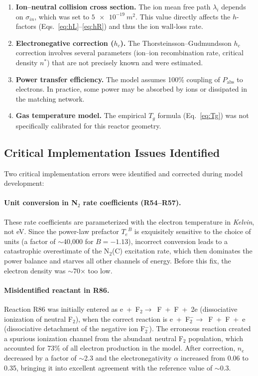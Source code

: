 \documentclass[11pt,a4paper]{article}
\newcommand{\Te}{\ensuremath{T_e}}
\newcommand{\Tg}{\ensuremath{T_g}}
\renewcommand{\ne}{\ensuremath{n_e}}
\begin{document}
\begin{enumerate}[nosep]
  \item \textbf{Ion--neutral collision cross section.} The ion mean free path
    $\lambda_i$ depends on $\sigma_{in}$, which was set to
    $\SI{5e-19}{m^2}$. This value directly affects the $h$-factors
    (Eqs.~\ref{eq:hL}--\ref{eq:hR}) and thus the ion wall-loss rate.
  \item \textbf{Electronegative correction ($h_c$).} The Thorsteinsson--Gudmundsson
    $h_c$ correction involves several parameters (ion--ion recombination rate,
    critical density $n^*$) that are not precisely known and were estimated.
  \item \textbf{Power transfer efficiency.} The model assumes 100\% coupling of
    $P_{\text{abs}}$ to electrons. In practice, some power may be absorbed by
    ions or dissipated in the matching network.
  \item \textbf{Gas temperature model.} The empirical $\Tg$ formula
    (Eq.~\ref{eq:Tg}) was not specifically calibrated for this reactor geometry.
\end{enumerate}


\subsection{Critical Implementation Issues Identified}

Two critical implementation errors were identified and corrected during model
development:

\paragraph{Unit conversion in N$_2$ rate coefficients (R54--R57).}
These rate coefficients are parameterized with the electron temperature in
\textit{Kelvin}, not eV. Since the power-law prefactor $\Te^B$ is exquisitely
sensitive to the choice of units (a factor of $\sim$40{,}000 for $B = -1.13$),
incorrect conversion leads to a catastrophic overestimate of the N$_2$(C)
excitation rate, which then dominates the power balance and starves all other
channels of energy. Before this fix, the electron density was $\sim$70$\times$
too low.

\paragraph{Misidentified reactant in R86.}
Reaction R86 was initially entered as e~+~F$_2 \to$~F~+~F~+~2e (dissociative
ionization of neutral F$_2$), when the correct reaction is
e~+~F$_2^- \to$~F~+~F~+~e (dissociative detachment of the negative ion
F$_2^-$). The erroneous reaction created a spurious ionization channel from the
abundant neutral F$_2$ population, which accounted for 73\% of all electron
production in the model. After correction, $\ne$ decreased by a factor of
$\sim$2.3 and the electronegativity $\alpha$ increased from 0.06 to 0.35,
bringing it into excellent agreement with the reference value of $\sim$0.3.
\end{document}

